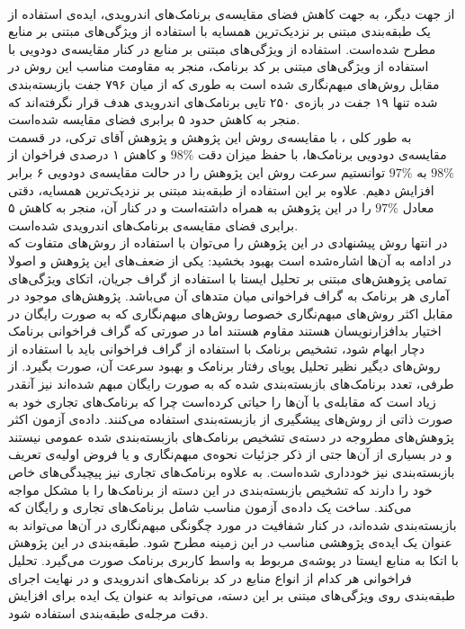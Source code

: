 \\
از جهت دیگر، به جهت کاهش فضای مقایسه‌ی برنامک‌های اندرویدی، ایده‌ی استفاده از یک طبقه‌بندی مبتنی بر نزدیک‌ترین همسایه با استفاده از ويژگی‌های مبتنی بر منابع مطرح شده‌است. استفاده از ویژگی‌های مبتنی بر منابع در کنار مقایسه‌ی دودویی با استفاده از ویژگی‌های مبتنی بر کد برنامک، منجر به مقاومت مناسب این روش در مقابل روش‌های مبهم‌نگاری شده است به طوری که از میان ۷۹۶ جفت‌ بازبسته‌بندی شده تنها ۱۹ جفت در بازه‌ی ۲۵۰ تایی برنامک‌های اندرویدی هدف قرار نگرفته‌اند که منجر به کاهش حدود ۵ برابری فضای مقایسه شده‌است.
\\
به طور کلی ، با مقایسه‌ی روش این پژوهش و پژوهش آقای ترکی، در قسمت مقایسه‌‌ی دودویی برنامک‌ها، با حفظ میزان دقت $98\%$ و کاهش ۱ درصدی فراخوان از $98\%$ به $97\%$ توانستیم سرعت روش این پژوهش را در حالت مقایسه‌ی دودویی ۶ برابر افزایش دهیم. علاوه بر این استفاده از طبقه‌بند مبتنی بر نزدیک‌ترین همسایه، دقتی معادل $97\%$ را در این پژوهش به همراه داشته‌است و در کنار آن، منجر به کاهش ۵ برابری فضای مقایسه‌ی برنامک‌های اندرویدی شده‌است.  \\
در انتها روش پیشنهادی در این پژوهش را می‌توان با استفاده از روش‌های متفاوت که در ادامه به آن‌ها اشاره‌شده است بهبود بخشید:‌
 یکی از ضعف‌های این پژوهش و اصولا تمامی پژوهش‌های مبتنی بر تحلیل ایستا با استفاده از گراف جریان، اتکای ویژگی‌های آماری هر برنامک به گراف فراخوانی میان متد‌های آن می‌باشد. پژوهش‌های موجود در مقابل اکثر روش‌های مبهم‌نگاری خصوصا روش‌های مبهم‌نگاری که به صورت رایگان در اختیار بدافزارنویسان هستند مقاوم هستند اما در صورتی که گراف فراخوانی برنامک‌ دچار ابهام شود، تشخیص برنامک با استفاده از گراف فراخوانی باید با استفاده از روش‌های دیگیر نظیر تحلیل پویای رفتار برنامک و بهبود سرعت آن، صورت بگیرد. از طرفی، تعدد برنامک‌های بازبسته‌بندی شده که به صورت رایگان مبهم شده‌اند نیز آنقدر زیاد است که مقابله‌ی با آن‌ها را حیاتی کرده‌است چرا که برنامک‌های تجاری خود به صورت ذاتی از روش‌های پیشگیری از بازبسته‌بندی استفاده می‌کنند. 
 داده‌ی آزمون اکثر پژوهش‌های مطروجه در دسته‌ی تشخیص برنامک‌های بازبسته‌بندی شده عمومی نیستند و در بسیاری از آن‌ها جتی از ذکر جزئیات نحوه‌ی مبهم‌نگاری و یا فروض اولیه‌ی تعریف بازبسته‌بندی نیز خودداری شده‌است. به علاوه برنامک‌های تجاری نیز پیچیدگی‌های خاص خود را دارند که تشخیص بازبسته‌بندی در این دسته از برنامک‌ها را با مشکل مواجه می‌کند. ساخت یک داده‌ی آزمون مناسب شامل برنامک‌های تجاری و رایگان که بازبسته‌بندی شده‌اند، در کنار شفافیت در مورد چگونگی مبهم‌نگاری در آن‌ها می‌تواند به عنوان یک ایده‌ی پژوهشی مناسب در این زمینه مطرح شود. 
 طبقه‌بندی در این پژوهش با اتکا به منابع ایستا در پوشه‌ی مربوط به واسط‌ کاربری برنامک صورت می‌گیرد. تحلیل فراخوانی هر کدام از انواع منابع در کد برنامک‌های اندرویدی و در نهایت اجرای طبقه‌بندی روی ویژگی‌های مبتنی بر این دسته، می‌تواند به عنوان یک ایده‌ برای افزایش دقت مرجله‌ی طبقه‌بندی استفاده شود. 








 